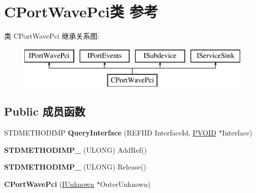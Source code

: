 \hypertarget{class_c_port_wave_pci}{}\section{C\+Port\+Wave\+Pci类 参考}
\label{class_c_port_wave_pci}
类 C\+Port\+Wave\+Pci 继承关系图\+:\begin{figure}[H]
\begin{center}
\leavevmode
\includegraphics[height=2.000000cm]{class_c_port_wave_pci}
\end{center}
\end{figure}
\subsection*{Public 成员函数}
\begin{DoxyCompactItemize}
\item 
\mbox{\label{class_c_port_wave_pci_af72689122b8705a7a23bdc71c526687a}} 
S\+T\+D\+M\+E\+T\+H\+O\+D\+I\+MP {\bfseries Query\+Interface} (R\+E\+F\+I\+ID Interface\+Id, \hyperlink{interfacevoid}{P\+V\+O\+ID} $\ast$Interface)
\item 
\mbox{\label{class_c_port_wave_pci_ac46460c8709ff76ec129de83c9d611bd}} 
{\bfseries S\+T\+D\+M\+E\+T\+H\+O\+D\+I\+M\+P\+\_\+} (U\+L\+O\+NG) Add\+Ref()
\item 
\mbox{\label{class_c_port_wave_pci_a2535beb23f65f98eea9ad35be3a4990e}} 
{\bfseries S\+T\+D\+M\+E\+T\+H\+O\+D\+I\+M\+P\+\_\+} (U\+L\+O\+NG) Release()
\item 
\mbox{\label{class_c_port_wave_pci_a68c997305e6414267c7d50ed8046206d}} 
{\bfseries C\+Port\+Wave\+Pci} (\hyperlink{interface_i_unknown}{I\+Unknown} $\ast$Outer\+Unknown)
\end{DoxyCompactItemize}
